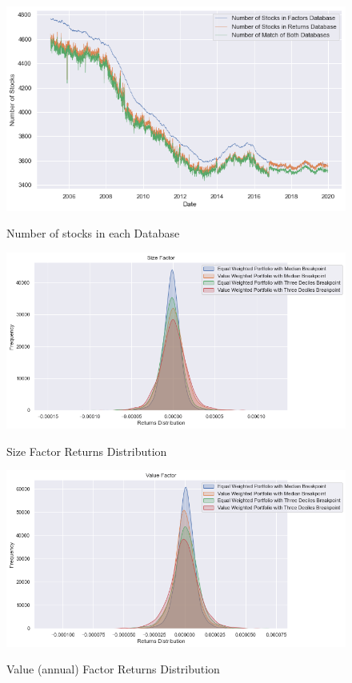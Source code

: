 \begin{figure}[H]
	\caption{Number of stocks in each Database}
	\centering
	\includegraphics[scale=.73]{../../output/figures/match.png}
	\label{fig:match}
\end{figure}



\begin{figure}[H]
	\caption{Size Factor Returns Distribution}
	\centering
	\includegraphics[scale=.63]{../../output/figures/size.png}
	\label{fig:size}
\end{figure}

\begin{figure}[H]
	\caption{Value (annual) Factor Returns Distribution}
	\centering
	\includegraphics[scale=.63]{../../output/figures/value.png}
	\label{fig:value}
\end{figure}

